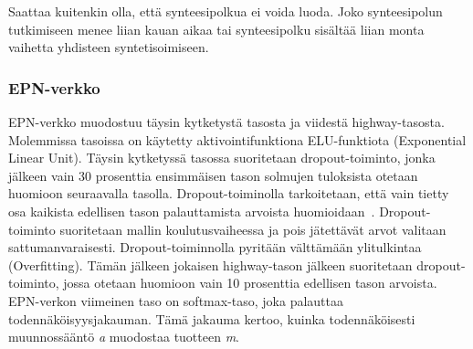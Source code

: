 \documentclass[finnish,twoside,censored,tkt,sw-line]{HYthesisML}
\begin{document}
Saattaa kuitenkin olla, että synteesipolkua ei voida luoda.
Joko synteesipolun tutkimiseen menee liian kauan aikaa tai synteesipolku sisältää liian monta vaihetta yhdisteen syntetisoimiseen.


\subsubsection{EPN-verkko}

EPN-verkko muodostuu täysin kytketystä tasosta ja viidestä highway-tasosta.
Molemmissa tasoissa on käytetty aktivointifunktiona ELU-funktiota (Exponential Linear Unit).
Täysin kytketyssä tasossa suoritetaan dropout-toiminto, jonka jälkeen vain 30 prosenttia ensimmäisen tason solmujen tuloksista otetaan huomioon seuraavalla tasolla.
Dropout-toiminolla tarkoitetaan, että vain tietty osa kaikista edellisen tason palauttamista arvoista huomioidaan~\cite{hinton2012improving}.
Dropout-toiminto suoritetaan mallin koulutusvaiheessa ja pois jätettävät arvot valitaan sattumanvaraisesti.
Dropout-toiminnolla pyritään välttämään ylitulkintaa (Overfitting).
Tämän jälkeen jokaisen highway-tason jälkeen suoritetaan dropout-toiminto, jossa otetaan huomioon vain 10 prosenttia edellisen tason arvoista.
EPN-verkon viimeinen taso on softmax-taso, joka palauttaa todennäköisyysjakauman.
Tämä jakauma kertoo, kuinka todennäköisesti muunnossääntö \emph{a} muodostaa tuotteen \emph{m}.
\end{document}
